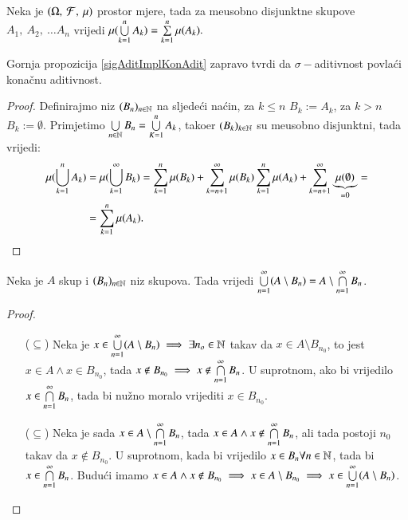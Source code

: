 \begin{prop} \label{sigAditImplKonAdit}
    Neka je $(\Omega, \: \mathcal{F}, \: \mu)$ prostor mjere, tada za me\dj usobno disjunktne skupove
    $A_1, \: A_2, \: \dots A_n$ vrijedi $\mu({\bigcup\limits_{k=1}^{n} A_k}) = \sum\limits_{k = 1}^{n}
    \mu({A_k}).$
\end{prop}

Gornja propozicija \ref{sigAditImplKonAdit} zapravo tvrdi da $\sigma-$aditivnost
povla\' ci kona\v cnu aditivnost.

\begin{proof}
    Definirajmo niz $(B_n)_{n \in \mathbb{N}}$ na sljede\' ci na\' cin, za $k \leq n$
    $B_k := A_k$, za $k > n$ $B_k := \emptyset$. Primjetimo
    $\bigcup\limits_{n \in \mathbb{N}}^{}B_n = \bigcup\limits_{K=1}^{n} A_k$, tako\dj er $(B_k)_{k \in \mathbb{N}}$ su
    me\dj usobno disjunktni, tada vrijedi:
    \begin{align*}
        \mu({\bigcup\limits_{k = 1}^{n} A_k}) &= \mu({\bigcup\limits_{k = 1}^{\infty} B_k}) =
            \sum\limits_{k = 1}^{n} \mu({B_k}) + \sum\limits_{k = n + 1}^{\infty} \mu({B_k})
            \sum\limits_{k=1}^{n} \mu({A_k}) + \sum\limits_{k=n+1}^{\infty}
            \underbrace{\mu({\emptyset})}_{= 0} = \\
        &= \sum\limits_{k=1}^{n} \mu({A_k}).
    \end{align*}
\end{proof}

\begin{lm}  \label{beskDeMorgan}
    Neka je $A$ skup i $(B_n)_{n \in \mathbb{N}}$ niz skupova. Tada vrijedi $\bigcup\limits_{n=1}^{\infty}
    (A \setminus B_n) = A \setminus \bigcap\limits_{n=1}^{\infty} B_n$.
\end{lm}

\begin{proof}
    \begin{itemize}
        \item[($\subseteq$)] Neka je $x \in \bigcup\limits_{n=1}^{\infty} (A \setminus B_n) \implies
            \exists n_o \in \mathbb{N}$ takav da $x \in A \setminus B_{n_0}$, to jest $x \in A \land
            x \in B_{n_0}$, tada $x \notin B_{n_0} \implies x \notin \bigcap\limits_{n=1}^{\infty} B_n$.
            U suprotnom, ako bi vrijedilo $x \in \bigcap\limits_{n=1}^{\infty} B_n$, tada bi nu\v zno
            moralo vrijediti $x \in B_{n_0}$.
        \item[($\subseteq$)] Neka je sada $x \in A \setminus \bigcap\limits_{n=1}^{\infty} B_n$,
            tada $x \in A \land x \notin \bigcap\limits_{n=1}^{\infty} B_n$, ali tada postoji
            $n_0$ takav da $x \notin B_{n_0}$. U suprotnom, kada bi vrijedilo
            $x \in B_n \forall n \in \mathbb{N}$, tada bi $x \in \bigcap\limits_{n=1}^{\infty} B_n$.
            Budu\' ci imamo $x \in A \land x \notin B_{n_0} \implies x \in A \setminus
            B_{n_0} \implies x \in \bigcup\limits_{n=1}^{\infty} (A \setminus B_n)$.
    \end{itemize}
\end{proof}

